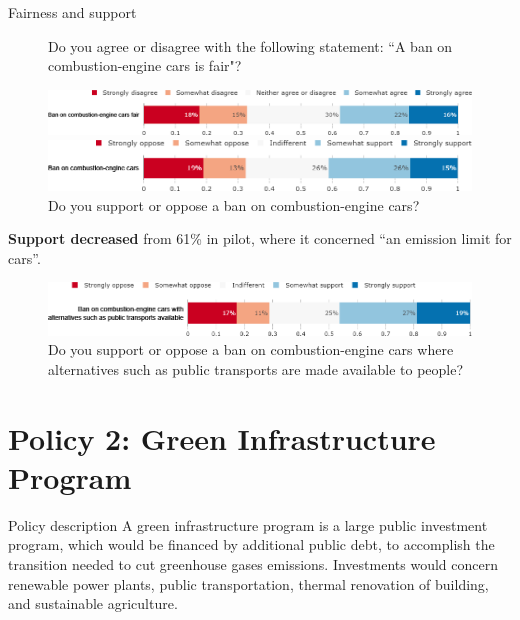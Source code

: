 \documentclass[aspectratio=169,9pt,dvipsnames]{beamer}
\begin{document}
\begin{frame}{Fairness and support}%
\begin{figure}[h!]
\centering
\caption{Do you agree or disagree with the following statement: ``A ban on combustion-engine cars is fair"?}
\includegraphics[width=\textwidth]{../figures/US/standard_fair_US.png}
\vspace{.5cm}
\centering
\caption{Do you support or oppose a ban on combustion-engine cars?}
\includegraphics[width=\textwidth]{../figures/US/standard_support_US.png}
\end{figure}

\textbf{Support decreased} from 61\% in pilot, where it concerned ``an emission limit for cars''.
\end{frame}

\begin{frame}{}%
\begin{figure}[h!]
\centering
\caption{Do you support or oppose a ban on combustion-engine cars where alternatives such as public transports are made available to people?}
\includegraphics[width=\textwidth]{../figures/US/standard_public_transport_support_US.png}
\end{figure}
\end{frame}

\section{Policy 2: Green Infrastructure Program}

\begin{frame}{Policy description}%
A green infrastructure program is a large public investment program, which would be financed by additional public debt, to accomplish the transition needed to cut greenhouse gases emissions. Investments would concern renewable power plants, public transportation, thermal renovation of building, and sustainable agriculture.
\end{frame}
\end{document}
